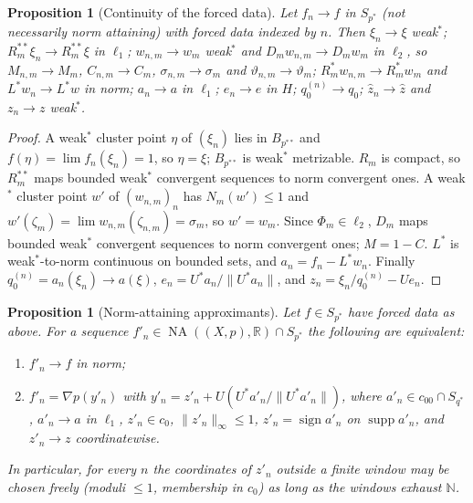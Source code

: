 \documentclass[10pt]{amsart}
\newtheorem{proposition}[theorem]{Proposition}
\theoremstyle{definition}
\theoremstyle{remark}
\newcommand{\NA}{\operatorname{NA}}
\newcommand{\supp}{\operatorname{supp}}
\newcommand{\sgn}{\operatorname{sign}}
\newcommand{\R}{\mathbb R}
\newcommand{\N}{\mathbb N}
\newcommand{\zh}{\hat z}
\begin{document}
\begin{proposition}[Continuity of the forced data]\label{prop:continuity}
Let $f_n\to f$ in $S_{p^*}$ \textup{(}not necessarily norm attaining\textup{)}
with forced data indexed by $n$.  Then $\xi_n\to\xi$ weak$^*$;
$R_m^{**}\xi_n\to R_m^{**}\xi$ in $\ell_1$; $w_{n,m}\to w_m$ weak$^*$ and
$D_mw_{n,m}\to D_mw_m$ in $\ell_2$, so $M_{n,m}\to M_m$, $C_{n,m}\to C_m$,
$\sigma_{n,m}\to\sigma_m$ and $\vartheta_{n,m}\to\vartheta_m$;
$R_m^*w_{n,m}\to R_m^*w_m$ and $L^*w_n\to L^*w$ in norm; $a_n\to a$ in
$\ell_1$; $e_n\to e$ in $H$; $q_0^{(n)}\to q_0$; $\zh_n\to\zh$ and
$z_n\to z$ weak$^*$.
\end{proposition}

\begin{proof}
A weak$^*$ cluster point $\eta$ of $(\xi_n)$ lies in $B_{p^{**}}$ and
$f(\eta)=\lim f_n(\xi_n)=1$, so $\eta=\xi$; $B_{p^{**}}$ is weak$^*$
metrizable.  $R_m$ is compact, so $R_m^{**}$ maps bounded weak$^*$
convergent sequences to norm convergent ones.  A weak$^*$ cluster point
$w'$ of $(w_{n,m})_n$ has $N_m(w')\le1$ and
$w'(\zeta_m)=\lim w_{n,m}(\zeta_{n,m})=\sigma_m$, so $w'=w_m$.  Since
$\Phi_m\in\ell_2$, $D_m$ maps bounded weak$^*$ convergent sequences to
norm convergent ones; $M=1-C$.  $L^*$ is weak$^*$-to-norm continuous on
bounded sets, and $a_n=f_n-L^*w_n$.  Finally
$q_0^{(n)}=a_n(\xi_n)\to a(\xi)$, $e_n=U^*a_n/\|U^*a_n\|$, and
$z_n=\xi_n/q_0^{(n)}-Ue_n$.
\end{proof}

\begin{proposition}[Norm-attaining approximants]\label{prop:approximants}
Let $f\in S_{p^*}$ have forced data as above.  For a sequence
$f'_n\in\NA((X,p),\R)\cap S_{p^*}$ the following are equivalent:
\begin{enumerate}
\item[(i)] $f'_n\to f$ in norm;
\item[(ii)] $f'_n=\nabla p(y'_n)$ with $y'_n=z'_n+U(U^*a'_n/\|U^*a'_n\|)$,
where $a'_n\in c_{00}\cap S_{q^*}$, $a'_n\to a$ in $\ell_1$, $z'_n\in c_0$,
$\|z'_n\|_\infty\le1$, $z'_n=\sgn a'_n$ on $\supp a'_n$, and $z'_n\to z$
coordinatewise.
\end{enumerate}
In particular, for every $n$ the coordinates of $z'_n$ outside a finite
window may be chosen freely \textup{(}moduli $\le1$, membership in
$c_0$\textup{)} as long as the windows exhaust $\N$.
\end{proposition}
\end{document}
